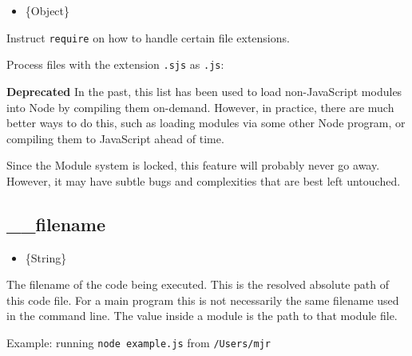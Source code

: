 \begin{itemize}
\itemsep1pt\parskip0pt
\item
  \{Object\}
\end{itemize}

Instruct \texttt{require} on how to handle certain file extensions.

Process files with the extension \texttt{.sjs} as \texttt{.js}:

\begin{Shaded}
\begin{Highlighting}[]
\NormalTok{[}\NormalTok{] = }\NormalTok{[}\NormalTok{];}
\end{Highlighting}
\end{Shaded}

\textbf{Deprecated} In the past, this list has been used to load
non-JavaScript modules into Node by compiling them on-demand. However,
in practice, there are much better ways to do this, such as loading
modules via some other Node program, or compiling them to JavaScript
ahead of time.

Since the Module system is locked, this feature will probably never go
away. However, it may have subtle bugs and complexities that are best
left untouched.

\subsection{\_\_filename}\label{filename}

\begin{itemize}
\itemsep1pt\parskip0pt
\item
  \{String\}
\end{itemize}

The filename of the code being executed. This is the resolved absolute
path of this code file. For a main program this is not necessarily the
same filename used in the command line. The value inside a module is the
path to that module file.

Example: running \texttt{node example.js} from \texttt{/Users/mjr}

\begin{Shaded}
\begin{Highlighting}[]
\end{Highlighting}
\end{Shaded}

